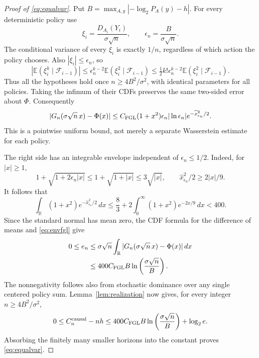 \documentclass[11pt,a4paper]{article}
\newcommand{\E}{\mathbb E}
\newcommand{\causal}{\mathrm{causal}}
\newcommand{\R}{\mathbb R}
\begin{document}
\begin{proof}[Proof of \eqref{eq:equalvar}]
Put $B=\max_{A,y}|-\log_2P_A(y)-h|$. For every deterministic policy use
\[
\xi_i=\frac{D_{A_i}(Y_i)}{\sigma\sqrt n},\qquad
\epsilon_n=\frac{B}{\sigma\sqrt n}.
\]
The conditional variance of every $\xi_i$ is exactly $1/n$, regardless
of which action the policy chooses. Also $|\xi_i|\le\epsilon_n$, so
\[
\left|\E(\xi_i^k\mid\mathcal F_{i-1})\right|
\le\epsilon_n^{k-2}\E(\xi_i^2\mid\mathcal F_{i-1})
\le\tfrac12 k!\epsilon_n^{k-2}\E(\xi_i^2\mid\mathcal F_{i-1}).
\]
Thus all the hypotheses hold once $n\ge4B^2/\sigma^2$, with identical
parameters for all policies. Taking the infimum of their CDFs preserves
the same two-sided error about $\Phi$. Consequently
\begin{equation}\label{eq:envfgl}
|G_n(\sigma\sqrt n\,x)-\Phi(x)|
\le C_{\rm FGL}(1+x^2)\epsilon_n|\ln\epsilon_n|
e^{-\widehat x_{\epsilon_n}^2/2}.
\end{equation}
This is a pointwise uniform bound, not merely a separate Wasserstein
estimate for each policy.

The right side has an integrable envelope independent of
$\epsilon_n\le1/2$. Indeed, for $|x|\ge1$,
\[
1+\sqrt{1+2\epsilon_n|x|}
\le1+\sqrt{1+|x|}\le3\sqrt{|x|},\qquad
\widehat x_{\epsilon_n}^2/2\ge2|x|/9.
\]
It follows that
\[
\int_{\R}(1+x^2)e^{-\widehat x_{\epsilon_n}^2/2}\,dx
\le\frac83+2\int_0^\infty(1+x^2)e^{-2x/9}\,dx<400.
\]
Since the standard normal has mean zero, the CDF formula for the
difference of means and \eqref{eq:envfgl} give
\begin{align*}
0\le e_n
&\le\sigma\sqrt n\int_{\R}|G_n(\sigma\sqrt n\,x)-\Phi(x)|\,dx\\
&\le400C_{\rm FGL}B\ln\left(\frac{\sigma\sqrt n}{B}\right).
\end{align*}
The nonnegativity follows also from stochastic dominance over any
single centered policy sum. Lemma~\ref{lem:realization} now gives,
for every integer $n\ge4B^2/\sigma^2$,
\[
0\le C_n^{\causal}-nh
\le400C_{\rm FGL}B\ln\left(\frac{\sigma\sqrt n}{B}\right)+\log_2e.
\]
Absorbing the finitely many smaller horizons into the constant proves
\eqref{eq:equalvar}.
\end{proof}
\end{document}
